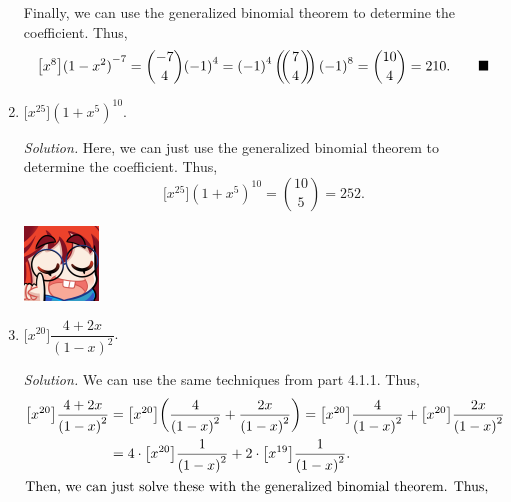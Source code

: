 \documentclass{article}
\newcommand{\multibinom}[2]{
  \left(\!\!\middle(\genfrac{}{}{0pt}{}{#1}{#2}\middle)\!\!\right)} %
\begin{document}
\begin{enumerate}
\[        \] Finally, we can use the generalized binomial theorem to determine the coefficient. Thus,\[
            \big[x^8\big] {(1-x^2)}^{-7} = \binom{-7}{4} {(-1)}^{4} = {(-1)}^{4} \multibinom{7}{4} {(-1)}^{8} = \binom{10}{4} = 210. \tag*{$\blacksquare$}
        \]
    \item $\big[x^{25}\big]{(1+x^5)}^{10}$.\par 
    \textit{Solution.} Here, we can just use the generalized binomial theorem to determine the coefficient. Thus,\[
        \big[x^{25}\big]{(1+x^5)}^{10} = \binom{10}{5} = 252. \tag*{$\blacksquare$} 
    \]
    \begin{minipage}[t]{.14\textwidth}
        \vspace{0pt}
        \includegraphics[width=2cm]{nerd_maddy.png} 
    \end{minipage}%
    \item $\big[x^{20}\big]\dfrac{4+2x}{{(1-x)}^2}$.\par 
    \textit{Solution.} We can use the same techniques from part 4.1.1. Thus,\begin{align*}
        \big[x^{20}\big]\dfrac{4+2x}{{(1-x)}^2} &= \big[x^{20}\big] \bigg( \frac{4}{{(1-x)}^2} + \frac{2x}{{(1-x)}^2} \bigg) = \big[x^{20}\big]\frac{4}{{(1-x)}^2} + \big[x^{20}\big]\frac{2x}{{(1-x)}^2} \\ 
        &= 4 \cdot \big[x^{20}\big] \frac{1}{{(1-x)}^2} + 2 \cdot \big[x^{19}\big] \frac{1}{{(1-x)}^2}. \\
        \intertext{Then, we can just solve these with the generalized binomial theorem. Thus,}

\end{align*}
\end{enumerate}
\end{document}
